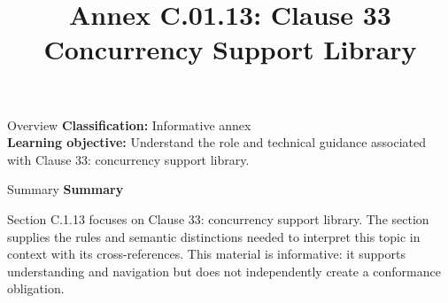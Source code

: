 \documentclass[10pt,letterpaper]{article}
\title{Annex C.01.13: Clause 33 Concurrency Support Library}
\author{}
\date{}
\begin{document}
\maketitle
\begin{CornellOverviewBox}{Overview}
\textbf{Classification:} Informative annex\\[2pt]
\textbf{Learning objective:} Understand the role and technical guidance associated with Clause 33: concurrency support library.
\end{CornellOverviewBox}\begin{CornellSummaryBox}{Summary}
{\sffamily\bfseries\color{Accent} Summary}\par\vspace{3pt}Section C.1.13 focuses on Clause 33: concurrency support library. The section supplies the rules and semantic distinctions needed to interpret this topic in context with its cross-references. This material is informative: it supports understanding and navigation but does not independently create a conformance obligation.
\end{CornellSummaryBox}
\end{document}
